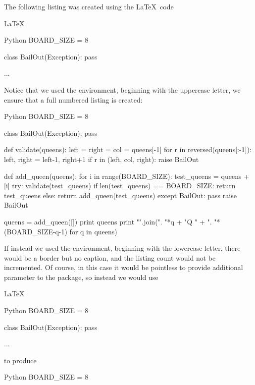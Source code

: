 {{The following listing was created using the \LaTeX~code
\begin{snippet}{LaTeX}
\begin{Snippet}[caption=An example from \protect\url{https://wiki.python.org/moin/SimplePrograms}: 8-Queens Problem (define your own exceptions)]{Python}
BOARD_SIZE = 8

class BailOut(Exception):
    pass

...
\end{Snippet}
\end{snippet}
Notice that we used the  environment, beginning with the uppercase letter, we ensure that a full numbered listing is created:
\begin{Snippet}[caption=An example from \protect\url{https://wiki.python.org/moin/SimplePrograms}: 8-Queens Problem (define your own exceptions)]{Python}
BOARD_SIZE = 8

class BailOut(Exception):
    pass

def validate(queens):
    left = right = col = queens[-1]
    for r in reversed(queens[:-1]):
        left, right = left-1, right+1
        if r in (left, col, right):
            raise BailOut

def add_queen(queens):
    for i in range(BOARD_SIZE):
        test_queens = queens + [i]
        try:
            validate(test_queens)
            if len(test_queens) == BOARD_SIZE:
                return test_queens
            else:
                return add_queen(test_queens)
        except BailOut:
            pass
    raise BailOut

queens = add_queen([])
print queens
print "\n".join(". "*q + "Q " + ". "*(BOARD_SIZE-q-1) for q in queens)
\end{Snippet}

If instead we used the  environment, beginning with the lowercase letter, there would be a border but no caption, and the listing count would not be incremented. Of course, in this case it would be pointless to provide additional  parameter to the  package, so instead we would use
\begin{snippetx}{LaTeX}
\begin{snippet}{Python}
BOARD_SIZE = 8

class BailOut(Exception):
    pass

...
\end{snippet}
\end{snippetx}
to produce
\begin{snippet}{Python}
BOARD_SIZE = 8


\end{snippet}}}
